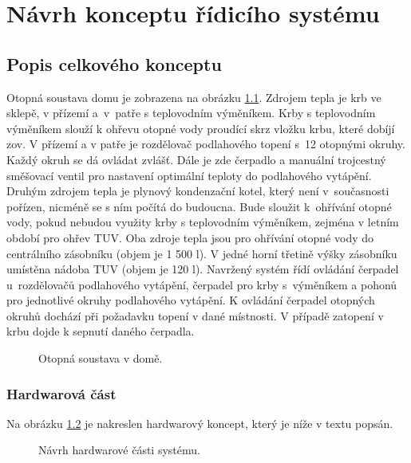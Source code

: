 \chapter{Návrh konceptu řídicího systému}

\section{Popis celkového konceptu}
\label{sec:popis-celkoveho-konceptu}

Otopná soustava domu je zobrazena na obrázku \ref{fig:otopna-soustava-rez-domu}. Zdrojem tepla je krb ve sklepě, v přízemí a~v~patře s teplovodním výměníkem. Krby s teplovodním výměníkem slouží k ohřevu otopné vody proudící skrz vložku krbu, které dobíjí \acrshort{zov}. V přízemí a v patře je rozdělovač podlahového topení s~12 otopnými okruhy. Každý okruh se dá ovládat zvlášť. Dále je zde čerpadlo a manuální trojcestný směšovací ventil pro nastavení optimální teploty do podlahového vytápění. Druhým zdrojem tepla je plynový kondenzační kotel, který není v~současnosti pořízen, nicméně se s ním počítá do budoucna. Bude sloužit k~ohřívání otopné vody, pokud nebudou využity krby s teplovodním výměníkem, zejména v letním období pro ohřev TUV. Oba zdroje tepla jsou pro ohřívání otopné vody do centrálního zásobníku (objem je 1 500 l). V jedné horní třetině výšky zásobníku umístěna nádoba TUV (objem je 120 l). Navržený systém řídí ovládání čerpadel u~rozdělovačů podlahového vytápění, čerpadel pro krby s~výměníkem a pohonů pro jednotlivé okruhy podlahového vytápění. K ovládání čerpadel otopných okruhů dochází při požadavku topení v dané místnosti. V případě zatopení v krbu dojde k sepnutí daného čerpadla.


\begin{figure}[H]
    \centering
    \def\svgwidth{\columnwidth}
    
    \caption{Otopná soustava v domě.}
    \label{fig:otopna-soustava-rez-domu}
\end{figure}

\newpage

\subsection{Hardwarová část}

Na obrázku \ref{fig:navrh-hardwarove-casti} je nakreslen hardwarový koncept, který je níže v textu popsán.

\begin{figure}[H]
    \centering
    \def\svgwidth{\columnwidth}
    
    \caption{ Návrh hardwarové části systému.}
    \label{fig:navrh-hardwarove-casti}
\end{figure}

